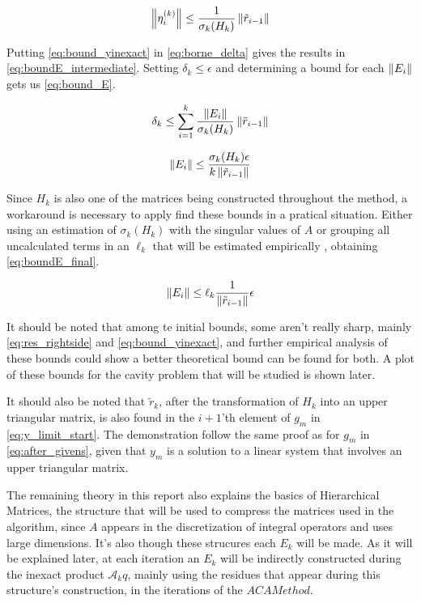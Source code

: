 \begin{equation}\label{eq:bound_yinexact}
    \left\lVert\eta_{i}^{(k)}\right\rVert \leq \frac{1}{\sigma_{k}(H_{k})} \left\lVert\tilde{r}_{i-1}\right\rVert
\end{equation}

Putting \ref{eq:bound_yinexact} in \ref{eq:borne_delta} gives the results in \ref{eq:boundE_intermediate}. Setting $\delta_{k} \leq \epsilon$ and determining a bound for each $\left\lVert E_{i}\right\rVert$ gets us \ref{eq:bound_E}.


\begin{equation}\label{eq:boundE_intermediate}
    \delta_{k} \leq \sum_{i=1}^{k} \frac{\left\lVert E_{i}\right\rVert}{\sigma_{k}(H_{k})}\left\lVert\tilde{r}_{i-1}\right\rVert
\end{equation}

\begin{equation}\label{eq:bound_E}
    \left\lVert E_{i}\right\rVert \leq \frac{\sigma_{k}(H_{k})\epsilon}{k\left\lVert\tilde{r}_{i-1}\right\rVert}
\end{equation}

Since $H_{k}$ is also one of the matrices being constructed throughout the method, a workaround is necessary to apply find these bounds in a pratical situation. Either using an estimation of $\sigma_{k}(H_{k})$ with the singular values of $A$ or grouping all uncalculated terms in an $\ell_{k}$ that will be estimated empirically \cite{simoncini2003theory}, obtaining \ref{eq:boundE_final}.

\begin{equation}\label{eq:boundE_final}
    \left\lVert E_{i}\right\rVert \leq \ell_{k} \frac{1}{\left\lVert\tilde{r}_{i-1}\right\rVert} \epsilon
\end{equation}

It should be noted \cite{simoncini2003theory} that among te initial bounds, some aren't really sharp, mainly \ref{eq:res_rightside} and \ref{eq:bound_yinexact}, and further empirical analysis of these bounds could show a better theoretical bound can be found for both. A plot of these bounds for the cavity problem that will be studied is shown later.

It should also be noted that $\tilde{r}_{k}$, after the transformation of $H_{k}$ into an upper triangular matrix, is also found in the $i+1$'th element of $g_{m}$ in \ref{eq:y_limit_start}. The demonstration follow the same proof as for $g_{m}$ in \ref{eq:after_givens}, given that $y_{m}$ is a solution to a linear system that involves an upper triangular matrix.

The remaining theory in this report also explains the basics of Hierarchical Matrices, the structure that will be used to compress the matrices used in the algorithm, since $A$ appears in the discretization of integral operators and uses large dimensions.
It's also though these strucures each $E_{k}$ will be made. As it will be explained later, at each iteration an $E_{k}$ will be indirectly constructed during the inexact product $\mathcal{A}_{k}q$, mainly using the residues that appear during this structure's construction, in the iterations of the $ACA Method$.